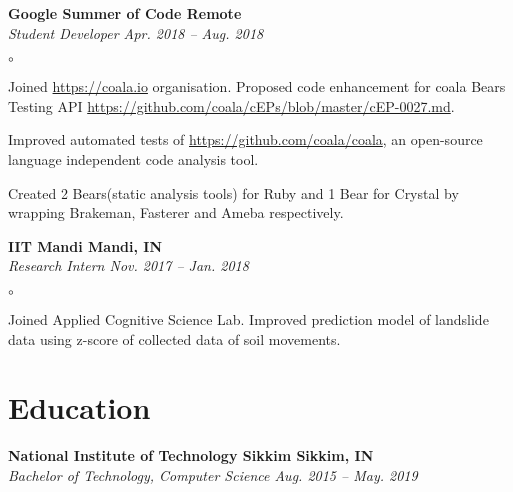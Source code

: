 \documentclass[margin,line]{resume}
\begin{document}
\begin{resume}
    \textbf{Google Summer of Code                                                                 \hfill    Remote} \\%
    \emph{Student Developer                                                         \hfill    Apr. 2018 -- Aug. 2018} %
    \begin{list}{$\circ$}{}
        \item Joined \url{https://coala.io} organisation. Proposed code enhancement for coala Bears Testing API       %
              \url{https://github.com/coala/cEPs/blob/master/cEP-0027.md}.
        \item Improved automated tests of \url{https://github.com/coala/coala}, an open-source language independent
              code analysis tool.
        \item Created 2 Bears(static analysis tools) for Ruby and 1 Bear for Crystal by wrapping Brakeman, Fasterer and
              Ameba respectively.
    \end{list}

    \textbf{IIT Mandi                                                                          \hfill    Mandi, IN} \\%
    \emph{Research Intern                                                           \hfill    Nov. 2017 -- Jan. 2018} %
    \begin{list}{$\circ$}{}
        \item Joined Applied Cognitive Science Lab. Improved prediction model of landslide data using z-score of      %
              collected data of soil movements.
    \end{list}

    \section{\mysidestyle Education}

    \textbf{National Institute of Technology Sikkim                                           \hfill    Sikkim, IN} \\%
    \emph{Bachelor of Technology, Computer Science                                   \hfill    Aug. 2015 -- May. 2019}%


\end{resume}
\end{document}
